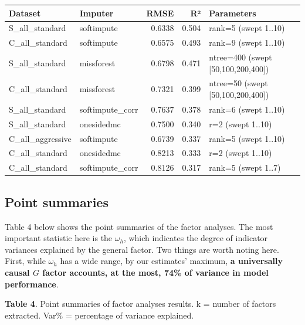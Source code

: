 \documentclass{article} %
\begin{document}
\begin{longtable}[]{@{}llrrl@{}}
\toprule\noalign{}
Dataset & Imputer & RMSE & R² & Parameters \\
\midrule\noalign{}
\endhead
\bottomrule\noalign{}
\endlastfoot
S\_all\_standard & softimpute & 0.6338 & 0.504 & rank=5 (swept 1..10) \\
C\_all\_standard & softimpute & 0.6575 & 0.493 & rank=9 (swept 1..10) \\
S\_all\_standard & missforest & 0.6798 & 0.471 & ntree=400 (swept {[}50,100,200,400{]}) \\
C\_all\_standard & missforest & 0.7321 & 0.399 & ntree=50 (swept {[}50,100,200,400{]}) \\
S\_all\_standard & softimpute\_corr & 0.7637 & 0.378 & rank=6 (swept 1..10) \\
S\_all\_standard & onesidedmc & 0.7500 & 0.340 & r=2 (swept 1..10) \\
C\_all\_aggressive & softimpute & 0.6739 & 0.337 & rank=5 (swept 1..10) \\
C\_all\_standard & onesidedmc & 0.8213 & 0.333 & r=2 (swept 1..10) \\
C\_all\_standard & softimpute\_corr & 0.8126 & 0.317 & rank=5 (swept 1..7) \\
\end{longtable}

\hypertarget{point-summaries}{%
\subsection{Point summaries}\label{point-summaries}}

Table 4 below shows the point summaries of the factor analyses. The most important statistic here is the \(\omega_h\), which indicates the degree of indicator variances explained by the general
factor. Two things are worth noting here. First, while \(\omega_h\) has a wide range, by our estimates' maximum, \textbf{a universally causal \(G\) factor accounts, at the most, 74\% of variance in
model performance}.

\textbf{Table 4}. Point summaries of factor analyses results. k = number of factors extracted. Var\% = percentage of variance explained.
\end{document}
